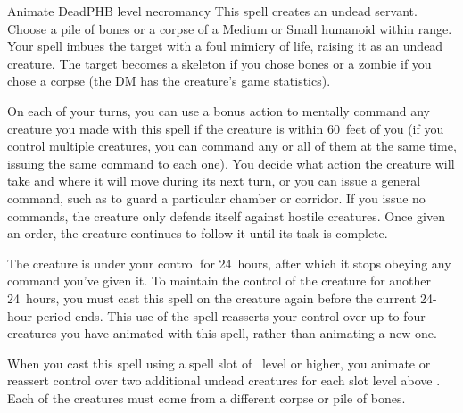 \begin{spell}{Animate Dead}{PHB}{ level necromancy}
{
}
This spell creates an undead servant. Choose a pile of
bones or a corpse of a Medium or Small humanoid within
range. Your spell imbues the target with a foul mimicry
of life, raising it as an undead creature. The target
becomes a skeleton if you chose bones or a zombie if you
chose a corpse (the DM has the creature's game statistics).

On each of your turns, you can use a bonus action to mentally
command any creature you made with this spell if the creature
is within 60~feet of you (if you control multiple creatures,
you can command any or all of them at the same time, issuing
the same command to each one). You decide what action the
creature will take and where it will move during its next
turn, or you can issue a general command, such as to guard
a particular chamber or corridor. If you issue no commands,
the creature only defends itself against hostile creatures.
Once given an order, the creature continues to follow it until
its task is complete.

The creature is under your control for 24~hours, after which
it stops obeying any command you’ve given it. To maintain the
control of the creature for another 24~hours, you must cast this
spell on the creature again before the current 24-hour period
ends. This use of the spell reasserts your control over up to
four creatures you have animated with this spell, rather than
animating a new one.

 When you cast this spell using a spell
slot of ~level or higher, you animate or reassert control
over two additional undead creatures for each slot level above
. Each of the creatures must come from a different corpse
or pile of bones.
\end{spell}